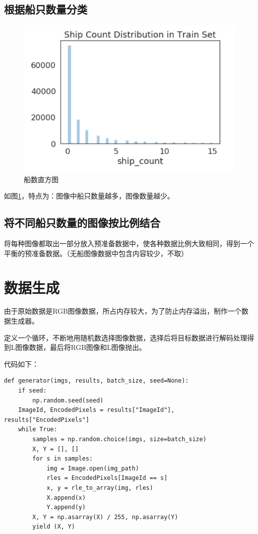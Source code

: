\subsection{根据船只数量分类}

\begin{figure}[htbp]
\centering
\includegraphics[width=0.8\linewidth]{body/model_pic/count_boat}
\caption{船数直方图}
\label{fig::model12}
\end{figure}

如图\ref{fig::model12}，特点为：图像中船只数量越多，图像数量越少。

\subsection{将不同船只数量的图像按比例结合}

将每种图像都取出一部分放入预准备数据中，使各种数据比例大致相同，得到一个平衡的预准备数据。（无船图像数据中包含内容较少，不取）

\section{数据生成}

由于原始数据是RGB图像数据，所占内存较大，为了防止内存溢出，制作一个数据生成器。

定义一个循环，不断地用随机数选择图像数据，选择后将目标数据进行解码处理得到L图像数据，最后将RGB图像和L图像抛出。

代码如下：

\begin{lstlisting}
def generator(imgs, results, batch_size, seed=None):
    if seed:
        np.random.seed(seed)
    ImageId, EncodedPixels = results["ImageId"], results["EncodedPixels"]
    while True:
        samples = np.random.choice(imgs, size=batch_size)
        X, Y = [], []
        for s in samples:
            img = Image.open(img_path)
            rles = EncodedPixels[ImageId == s]
            x, y = rle_to_array(img, rles)
            X.append(x)
            Y.append(y)
        X, Y = np.asarray(X) / 255, np.asarray(Y)
        yield (X, Y)
\end{lstlisting}

